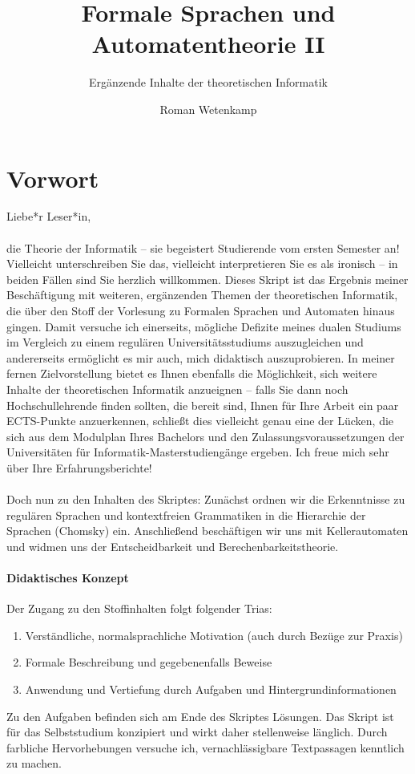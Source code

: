 \documentclass[11pt,a4paper]{scrreport}
\title{Formale Sprachen und Automatentheorie II}
\subtitle{Ergänzende Inhalte der theoretischen Informatik}
\author{Roman Wetenkamp}
\theoremstyle{remark}
\theoremstyle{custom}
\begin{document}
\maketitle

\pagebreak
\tableofcontents
\pagebreak
\section*{Vorwort}
Liebe*r Leser*in,\\\\
die Theorie der Informatik -- sie begeistert Studierende vom ersten Semester an! Vielleicht unterschreiben Sie das, vielleicht interpretieren Sie es als ironisch -- in beiden Fällen sind Sie herzlich willkommen. Dieses Skript ist das Ergebnis meiner Beschäftigung mit weiteren, ergänzenden Themen der theoretischen Informatik, die über den Stoff der Vorlesung zu Formalen Sprachen und Automaten hinaus gingen. Damit versuche ich einerseits, mögliche Defizite meines dualen Studiums im Vergleich zu einem regulären Universitätsstudiums auszugleichen und andererseits ermöglicht es mir auch, mich didaktisch auszuprobieren. In meiner fernen Zielvorstellung bietet es Ihnen ebenfalls die Möglichkeit, sich weitere Inhalte der theoretischen Informatik anzueignen -- falls Sie dann noch Hochschullehrende finden sollten, die bereit sind, Ihnen für Ihre Arbeit ein paar ECTS-Punkte anzuerkennen, schließt dies vielleicht genau eine der Lücken, die sich aus dem Modulplan Ihres Bachelors und den Zulassungsvoraussetzungen der Universitäten für Informatik-Masterstudiengänge ergeben. Ich freue mich sehr über Ihre Erfahrungsberichte! \\\\
Doch nun zu den Inhalten des Skriptes: Zunächst ordnen wir die Erkenntnisse zu regulären Sprachen und kontextfreien Grammatiken in die Hierarchie der Sprachen (Chomsky) ein. Anschließend beschäftigen wir uns mit Kellerautomaten und widmen uns der Entscheidbarkeit und Berechenbarkeitstheorie.
\paragraph{Didaktisches Konzept}
Der Zugang zu den Stoffinhalten folgt folgender Trias:
\begin{enumerate}
\item Verständliche, normalsprachliche Motivation (auch durch Bezüge zur Praxis)
\item Formale Beschreibung und gegebenenfalls Beweise
\item Anwendung und Vertiefung durch Aufgaben und Hintergrundinformationen
\end{enumerate}
Zu den Aufgaben befinden sich am Ende des Skriptes Lösungen. Das Skript ist für das Selbststudium konzipiert und wirkt daher stellenweise länglich. Durch farbliche Hervorhebungen versuche ich, vernachlässigbare Textpassagen kenntlich zu machen. 
\end{document}
